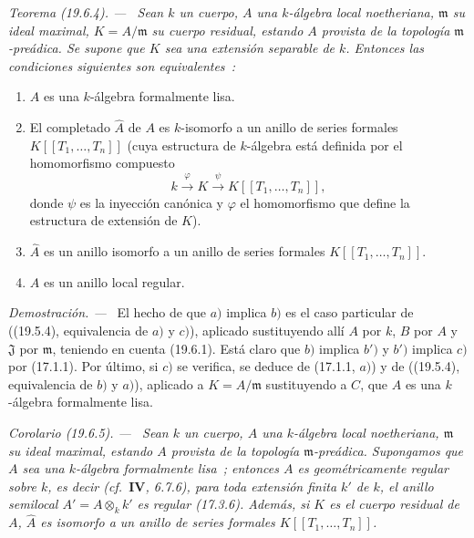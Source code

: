 \documentclass[10pt,oneside]{book}
\makeatletter
\newcommand{\setmanualcurrentlabel}[1]{\def\@currentlabel{#1}}
\newenvironment{theorem}[1][]{%
  \setmanualcurrentlabel{#1}\par\medskip\noindent\itshape Teorema (#1). ---\ }{\par}
\newenvironment{corollary}[1][]{%
  \setmanualcurrentlabel{#1}\par\medskip\noindent\itshape Corolario (#1). ---\ }{\par}
\newenvironment{proof}{%
  \par\medskip\noindent\textit{Demostración. ---\ }}{\par}
\makeatother
\begin{document}
\begin{theorem}[19.6.4]
\label{0.19.6.4-es}
Sean $k$ un cuerpo, $A$ una $k$-álgebra local noetheriana, $\mathfrak m$ su
ideal maximal, $K=A/\mathfrak m$ su cuerpo residual, estando $A$ provista de la
topología $\mathfrak m$-preádica. Se supone que $K$ sea una extensión
\textup{separable} de $k$. Entonces las condiciones siguientes son equivalentes~:
\begin{enumerate}
  \item[\textup{a)}] $A$ es una $k$-álgebra formalmente lisa.
  \item[\textup{b)}] El completado $\widehat A$ de $A$ es $k$-isomorfo a un anillo de
  series formales $K[[T_1,\ldots,T_n]]$ \textup{(cuya estructura de $k$-álgebra está
  definida por el homomorfismo compuesto}
  \[
    k\xrightarrow{\varphi}K\xrightarrow{\psi}K[[T_1,\ldots,T_n]],
  \]
  \textup{donde $\psi$ es la inyección canónica y $\varphi$ el homomorfismo que define
  la estructura de extensión de $K$)}.
  \item[\textup{b')}] $\widehat A$ es un anillo isomorfo a un anillo de series
  formales $K[[T_1,\ldots,T_n]]$.
  \item[\textup{c)}] $A$ es un anillo local regular.
\end{enumerate}
\end{theorem}

\begin{proof}
El hecho de que $a)$ implica $b)$ es el caso particular de ((19.5.4),
equivalencia de $a)$ y $c)$), aplicado sustituyendo allí $A$ por $k$, $B$ por
$A$ y $\mathfrak J$ por $\mathfrak m$, teniendo en cuenta (19.6.1). Está claro
que $b)$ implica $b')$ y $b')$ implica $c)$ por (17.1.1). Por último, si $c)$ se
verifica, se deduce de (17.1.1, $a)$) y de ((19.5.4), equivalencia de $b)$ y
$a)$), aplicado a $K=A/\mathfrak m$ sustituyendo a $C$, que $A$ es una
$k$-álgebra formalmente lisa.
\end{proof}

\begin{corollary}[19.6.5]
\label{0.19.6.5-es}
Sean $k$ un cuerpo, $A$ una $k$-álgebra local noetheriana, $\mathfrak m$ su
ideal maximal, estando $A$ provista de la topología $\mathfrak m$-preádica.
Supongamos que $A$ sea una $k$-álgebra formalmente lisa~; entonces $A$ es
geométricamente regular sobre $k$, es decir \textup{(cf.~$\mathbf{IV}$, 6.7.6)},
para toda extensión finita $k'$ de $k$, el anillo semilocal
$A'=A\otimes_k k'$ es regular \textup{(17.3.6)}. Además, si $K$ es el cuerpo
residual de $A$, $\widehat A$ es isomorfo a un anillo de series formales
$K[[T_1,\ldots,T_n]]$.
\end{corollary}
\end{document}
